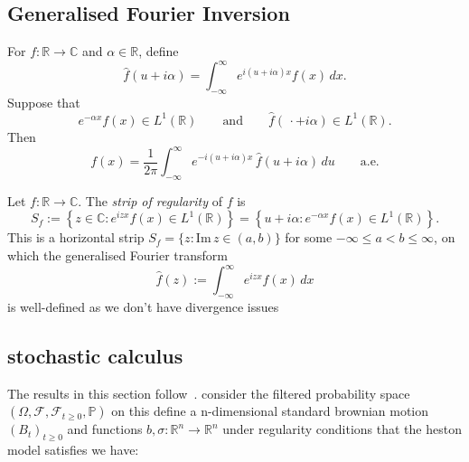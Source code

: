 \renewcommand{\thefigure}{A.\arabic{figure}}
\setcounter{figure}{0}
\subsection{Generalised Fourier Inversion}
\label{app:gen_fourier}

For $f:\mathbb{R}\to\mathbb{C}$ and $\alpha\in\mathbb{R}$, define
\begin{equation}
    \hat{f}(u + i\alpha) = \int_{-\infty}^{\infty} e^{i(u+i\alpha)x} f(x)\, dx.
\end{equation}
Suppose that
\begin{equation}
    e^{-\alpha x}f(x) \in L^1(\mathbb{R})
    \qquad \text{and} \qquad
    \hat{f}(\,\cdot + i\alpha) \in L^1(\mathbb{R}).
\end{equation}
Then
\begin{equation}
    f(x) = \frac{1}{2\pi}
    \int_{-\infty}^{\infty}
    e^{-i(u+i\alpha)x}\,\hat{f}(u+i\alpha)\,du \qquad \text{a.e.}
\end{equation}

\begin{definition}
    Let $f : \mathbb{R} \to \mathbb{C}$. The \emph{strip of regularity} of $f$ is
    \begin{equation}
        S_f := \left\{ z \in \mathbb{C} : e^{izx}f(x) \in L^1(\mathbb{R}) \right\}
        = \left\{ u + i\alpha : e^{-\alpha x}f(x) \in L^1(\mathbb{R}) \right\}.
    \end{equation}
    This is a horizontal strip $S_f = \{ z : \mathrm{Im}\, z \in (a, b) \}$ for
    some $-\infty \leq a < b \leq \infty$, on which the generalised Fourier
    transform
    \begin{equation}
        \hat{f}(z) := \int_{-\infty}^{\infty} e^{izx} f(x)\, dx
    \end{equation}
    is well-defined as we don't have divergence issues
\end{definition}

\subsection{stochastic calculus}
The results in this section follow~\cite{baudouin2019}.
consider the filtered probability space $(\Omega,\mathcal{F},\mathcal{F}_{t\geq0},\mathbb{P})$ on this define a n-dimensional standard brownian motion
$(B_t)_{t\geq0}$ and functions $b,\sigma:\mathbb{R}^n\rightarrow \mathbb{R}^n$
under regularity conditions that the heston model satisfies we have:

